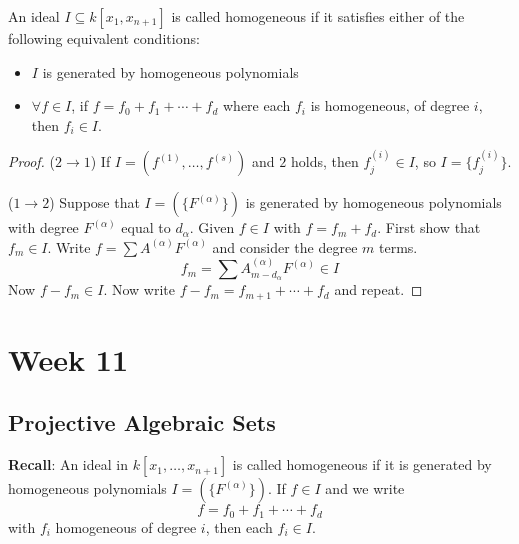 \documentclass{report}
\begin{document}
\begin{definition}{}
    An ideal $I \subseteq k[x_{1}, x_{n + 1}]$ is called homogeneous if it satisfies either of the following equivalent conditions:
        \begin{itemize}
            \item  $I$ is generated by homogeneous polynomials

            \item  $\forall f \in I$, if $f = f_{0} + f_{1} + \cdots + f_{d}$ where each $f_{i}$ is homogeneous, of degree $i$, then $f_{i} \in I$. 
        \end{itemize}
\end{definition}
    \begin{proof}
        ($2 \rightarrow 1$) If $I = (f^{(1)}, \ldots, f^{(s)})$ and $2$ holds, then $f_{j}^{(i)} \in I$, so $I = \{f_{j}^{(i)}\}$.

        ($1 \rightarrow 2$) Suppose that $I = (\{F^{(\alpha)}\})$ is generated by homogeneous polynomials with degree $F^{(\alpha)}$ equal to $d_{\alpha}$. Given $f \in I$ with $f = f_{m} + f_{d}$. First show that $f_{m} \in I$. Write $f = \sum A^{(\alpha)} F^{ (\alpha)}$ and consider the degree $m$ terms.
            \begin{equation*}
                f_{m} = \sum A^{(\alpha)}_{m - d_{\alpha}} F^{(\alpha)} \in I
            \end{equation*}
        Now $f - f_{m} \in I$. Now write $f - f_{m} = f_{m + 1} + \cdots + f_{d}$ and repeat.
    \end{proof}

\chapter{Week 11}

\begin{topic}
    \section{Projective Algebraic Sets}
\end{topic}

\textbf{Recall}: An ideal in $k[x_{1}, \ldots, x_{n + 1}]$ is called homogeneous if it is generated by homogeneous polynomials $I = (\{F^{(\alpha)}\})$. If $f \in I$ and we write
    \begin{equation*}
        f = f_{0} + f_{1} + \cdots + f_{d}
    \end{equation*}
with $f_{i}$ homogeneous of degree $i$, then each $f_{i} \in I$.
\end{document}
